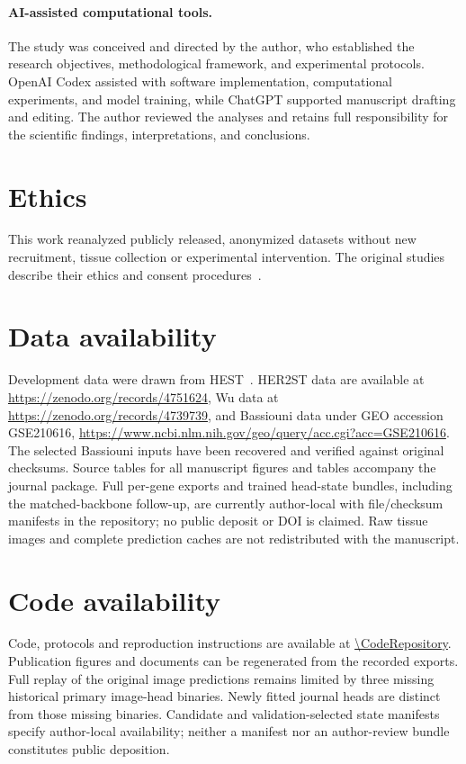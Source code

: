 \paragraph{AI-assisted computational tools.}
The study was conceived and directed by the author, who established the research objectives, methodological framework, and experimental protocols. OpenAI Codex assisted with software implementation, computational experiments, and model training, while ChatGPT supported manuscript drafting and editing. The author reviewed the analyses and retains full responsibility for the scientific findings, interpretations, and conclusions.

\section{Ethics}
This work reanalyzed publicly released, anonymized datasets without new recruitment, tissue collection or experimental intervention. The original studies describe their ethics and consent procedures~\cite{andersson2021,wu2021,bassiouni2023}.
\section{Data availability}
Development data were drawn from HEST~\cite{jaume2024}. HER2ST data are available at \url{https://zenodo.org/records/4751624}, Wu data at \url{https://zenodo.org/records/4739739}, and Bassiouni data under GEO accession GSE210616, \url{https://www.ncbi.nlm.nih.gov/geo/query/acc.cgi?acc=GSE210616}. The selected Bassiouni inputs have been recovered and verified against original checksums. Source tables for all manuscript figures and tables accompany the journal package. Full per-gene exports and trained head-state bundles, including the matched-backbone follow-up, are currently author-local with file/checksum manifests in the repository; no public deposit or DOI is claimed. Raw tissue images and complete prediction caches are not redistributed with the manuscript.
\section{Code availability}
Code, protocols and reproduction instructions are available at \url{\CodeRepository}. Publication figures and documents can be regenerated from the recorded exports. Full replay of the original image predictions remains limited by three missing historical primary image-head binaries. Newly fitted journal heads are distinct from those missing binaries. Candidate and validation-selected state manifests specify author-local availability; neither a manifest nor an author-review bundle constitutes public deposition.
